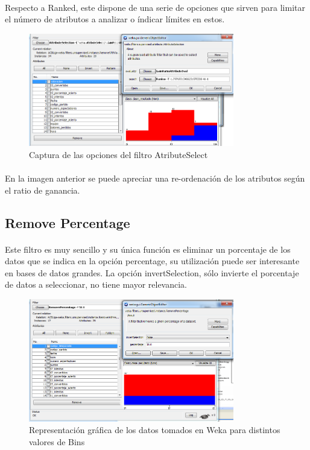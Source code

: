 \documentclass[es]{ifirak}
\begin{document}
\paragraph{}
Respecto a Ranked, este dispone de una serie de opciones que sirven para limitar el número de atributos a analizar o índicar límites en estos.

\begin{figure}[htbp]
\centering
\includegraphics[width=0.8\textwidth]{AtributeSelect.png}
\caption{Captura de las opciones del filtro AtributeSelect}\label{figure}
\end{figure}

\paragraph{}
En la imagen anterior se puede apreciar una re-ordenación de los atributos según el ratio de ganancia.

\subsection{Remove Percentage}
\paragraph{}
Este filtro es muy sencillo y su única función es eliminar un porcentaje de los datos que se indica en la opción percentage, su utilización puede ser interesante en bases de datos grandes. La opción invertSelection, sólo invierte el porcentaje de datos a seleccionar, no tiene mayor relevancia.

\begin{figure}[htbp]
\centering
\includegraphics[width=0.8\textwidth]{Removepercentage.png}
\caption{Representación gráfica de los datos tomados en Weka para distintos valores de Bins}\label{figure}
\end{figure}
\end{document}
